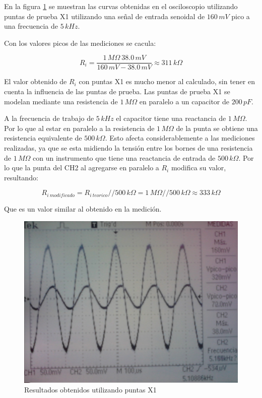 \documentclass[10pt,spanish,a4paper,notitlepage]{article}
\begin{document}
En la figura \ref{fig:medicion_Ri_X1} se muestran las curvas obtenidas
en el osciloscopio utilizando puntas de prueba X1 utilizando
una señal de entrada senoidal de $160\,\unit{mV}$ pico a una
frecuencia de $5\,\unit{kHz}$.

Con los valores picos de las mediciones se cacula:

\[ \displaystyle     R_i = \frac{1\,\unit{M\Omega}\  38.0\,\unit{mV}}{160\,\unit{mV} - 38.0\,\unit{mV}} 
\approx 311\,\unit{k\Omega}\]

El valor obtenido de $R_i$ con puntas X1 es mucho menor al calculado,
sin tener en cuenta la influencia de las puntas de prueba.
Las puntas de prueba X1 se modelan mediante
una resistencia de $1\,\unit{M\Omega}$ 
en paralelo a un capacitor de $200\,\unit{pF}$.

A la frecuencia de trabajo de $5\,\unit{kHz}$ el capacitor tiene
una reactancia de $1\,\unit{M\Omega}$. Por lo que al estar en paralelo
a la resistencia de $1\,\unit{M\Omega}$ de la punta se obtiene
una resistencia equivalente de $500\,\unit{k\Omega}$. Esto afecta considerablemente
a las mediciones realizadas, ya que se esta midiendo la tensión
entre los bornes de una resistencia de $1\,\unit{M\Omega}$ con
un instrumento que tiene una reactancia de entrada de
$500\,\unit{k\Omega}$.
Por lo que la punta del CH2 al agregarse en paralelo a $R_i$
modifica su valor, resultando:

\[ \displaystyle R_{i\ modificado} = R_{i\ teorico} // 500\,\unit{k\Omega}
= 1\,\unit{M\Omega} // 500\,\unit{k\Omega} \approx 333\,\unit{k\Omega} \]

Que es un valor similar al obtenido en la medición.

\begin{figure}[H]
\centering
\includegraphics[scale=0.12]{mediciones/Ri_puntaX1.jpg}
\caption{Resultados obtenidos utilizando puntas X1}
\label{fig:medicion_Ri_X1}
\end{figure}
\end{document}
